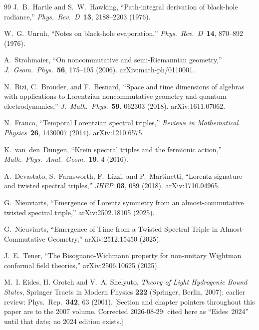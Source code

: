 \documentclass[11pt]{article}
\begin{document}
\begin{thebibliography}{99}
J.~B.~Hartle and S.~W.~Hawking, ``Path-integral derivation of
black-hole radiance,'' \textit{Phys.\ Rev.\ D}\ \textbf{13},
2188--2203 (1976).

W.~G.~Unruh, ``Notes on black-hole evaporation,''
\textit{Phys.\ Rev.\ D}\ \textbf{14}, 870--892 (1976).

A.~Strohmaier, ``On noncommutative and semi-Riemannian
geometry,'' \textit{J.\ Geom.\ Phys.}\ \textbf{56}, 175--195
(2006).  arXiv:math-ph/0110001.

N.~Bizi, C.~Brouder, and F.~Besnard, ``Space and time dimensions of
algebras with applications to Lorentzian noncommutative geometry
and quantum electrodynamics,'' \textit{J.\ Math.\ Phys.}\ \textbf{59},
062303 (2018).  arXiv:1611.07062.

N.~Franco, ``Temporal Lorentzian spectral triples,''
\textit{Reviews in Mathematical Physics}\ \textbf{26}, 1430007
(2014).  arXiv:1210.6575.

K.~van~den~Dungen, ``Krein spectral triples and the fermionic
action,'' \textit{Math.\ Phys.\ Anal.\ Geom.}\ \textbf{19}, 4 (2016).

A.~Devastato, S.~Farnsworth, F.~Lizzi, and P.~Martinetti, ``Lorentz
signature and twisted spectral triples,'' \textit{JHEP}\ \textbf{03}, 089 (2018).
arXiv:1710.04965.

G.~Nieuviarts, ``Emergence of Lorentz symmetry from an
almost-commutative twisted spectral triple,'' arXiv:2502.18105
(2025).

G.~Nieuviarts, ``Emergence of Time from a Twisted Spectral Triple
in Almost-Commutative Geometry,'' arXiv:2512.15450 (2025).

J.~E.~Tener,
``The Bisognano-Wichmann property for non-unitary Wightman conformal
field theories,''
arXiv:2506.10625 (2025).

M.~I. Eides, H. Grotch and V.~A. Shelyuto,
\emph{Theory of Light Hydrogenic Bound States},
Springer Tracts in Modern Physics \textbf{222} (Springer, Berlin, 2007);
earlier review: Phys.\ Rep.\ \textbf{342}, 63 (2001).
[Section and chapter pointers throughout this paper are to the 2007 volume.
Corrected 2026-08-29: cited here as ``Eides~2024'' until that date; no
2024 edition exists.]


\end{thebibliography}
\end{document}
